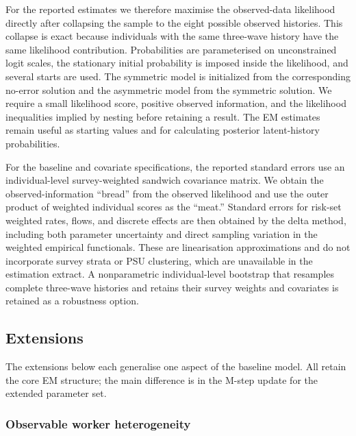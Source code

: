 For the reported estimates we therefore maximise the observed-data likelihood
directly after collapsing the sample to the eight possible observed histories.
This collapse is exact because individuals with the same three-wave history
have the same likelihood contribution. Probabilities are parameterised on
unconstrained logit scales, the stationary initial probability is imposed inside
the likelihood, and several starts are used. The symmetric model is initialized
from the corresponding no-error solution and the asymmetric model from the
symmetric solution. We require a small likelihood score, positive observed
information, and the likelihood inequalities implied by nesting before retaining
a result. The EM estimates remain useful as starting values and for calculating
posterior latent-history probabilities.

For the baseline and covariate specifications, the reported standard errors use an
individual-level survey-weighted sandwich covariance matrix. We obtain the
observed-information ``bread'' from the observed likelihood and use the outer
product of weighted individual scores as the ``meat.''
Standard errors for risk-set weighted rates, flows, and discrete effects are
then obtained by the delta method, including both parameter uncertainty and
direct sampling variation in the weighted empirical functionals. These are
linearisation approximations and do not incorporate survey strata or PSU
clustering, which are unavailable in the estimation extract. A nonparametric
individual-level bootstrap that resamples complete three-wave histories and
retains their survey weights and covariates is retained as a robustness option.

\subsection{Extensions}\label{subsec:extensions}

The extensions below each generalise one aspect of the baseline model. All
retain the core EM structure; the main difference is in the M-step update
for the extended parameter set.

\subsubsection{Observable worker heterogeneity}\label{subsubsec:covariates}

